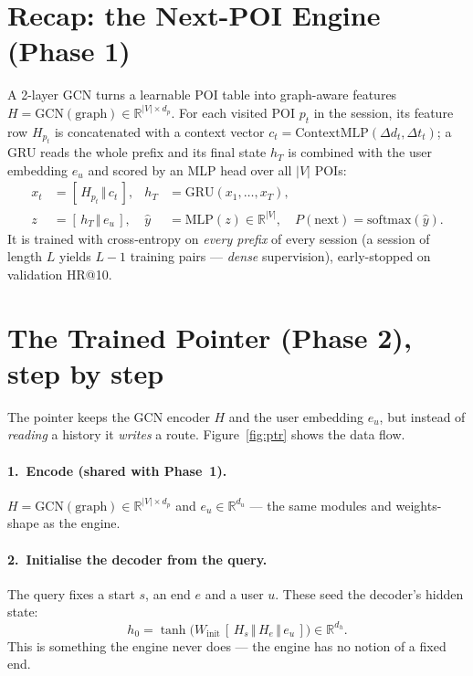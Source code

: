 \documentclass[11pt]{article}
\begin{document}
\section{Recap: the Next-POI Engine (Phase 1)}

A 2-layer GCN turns a learnable POI table into graph-aware features
$H=\mathrm{GCN}(\text{graph})\in\mathbb{R}^{|V|\times d_p}$. For each visited POI $p_t$ in the
session, its feature row $H_{p_t}$ is concatenated with a context vector
$c_t=\mathrm{ContextMLP}(\Delta d_t,\Delta t_t)$; a GRU reads the whole prefix and its final state
$h_T$ is combined with the user embedding $e_u$ and scored by an MLP head over all $|V|$ POIs:
\begin{align}
x_t &= [\,H_{p_t}\,\Vert\,c_t\,], &
h_T &= \mathrm{GRU}(x_1,\dots,x_T), \\
z &= [\,h_T\,\Vert\,e_u\,], &
\hat{y} &= \mathrm{MLP}(z)\in\mathbb{R}^{|V|},\quad P(\text{next})=\mathrm{softmax}(\hat{y}).
\end{align}
It is trained with cross-entropy on \emph{every prefix} of every session (a session of length $L$
yields $L-1$ training pairs --- \emph{dense} supervision), early-stopped on validation HR@10.

\section{The Trained Pointer (Phase 2), step by step}

The pointer keeps the GCN encoder $H$ and the user embedding $e_u$, but instead of \emph{reading} a
history it \emph{writes} a route. Figure~\ref{fig:ptr} shows the data flow.

\paragraph{1.\ Encode (shared with Phase~1).}
$H=\mathrm{GCN}(\text{graph})\in\mathbb{R}^{|V|\times d_p}$ and $e_u\in\mathbb{R}^{d_u}$ --- the same
modules and weights-shape as the engine.

\paragraph{2.\ Initialise the decoder from the query.}
The query fixes a start $s$, an end $e$ and a user $u$. These seed the decoder's hidden state:
\begin{equation}
h_0 = \tanh\!\big(W_{\mathrm{init}}\,[\,H_s\,\Vert\,H_e\,\Vert\,e_u\,]\big)\in\mathbb{R}^{d_h}.
\end{equation}
This is something the engine never does --- the engine has no notion of a fixed end.
\end{document}

